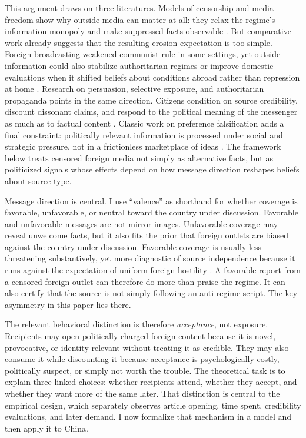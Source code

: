 \documentclass[12pt,american]{article}
\begin{document}
	This argument draws on three literatures. Models of censorship and media freedom show why outside media can matter at all: they relax the regime's information monopoly and make suppressed facts observable \citep{BesleyPrat2006,EgorovGurievSonin2009,gurievtreisman2019,chenyang2019}. But comparative work already suggests that the resulting erosion expectation is too simple. Foreign broadcasting weakened communist rule in some settings, yet outside information could also stabilize authoritarian regimes or improve domestic evaluations when it shifted beliefs about conditions abroad rather than repression at home \citep{KernHainmueller2009,EnikolopovPetrovaZhuravskaya2011,KayserPeress2012,huang2015international}. Research on persuasion, selective exposure, and authoritarian propaganda points in the same direction. Citizens condition on source credibility, discount dissonant claims, and respond to the political meaning of the messenger as much as to factual content \citep{zaller1992,LupiaMcCubbins1998CUP,GentzkowShapiro2006,taberlodge2006,ValloneRossLepper1985,huang2015signal,Huang2018,Horz2021,mattinglyyao2022,panshaoxu2021,GulottyYu2025,Zakharov2026,wangwestwood2024}. Classic work on preference falsification adds a final constraint: politically relevant information is processed under social and strategic pressure, not in a frictionless marketplace of ideas \citep{Kuran1991,Kuran1995}. The framework below treats censored foreign media not simply as alternative facts, but as politicized signals whose effects depend on how message direction reshapes beliefs about source type.
	
	Message direction is central. I use ``valence'' as shorthand for whether coverage is favorable, unfavorable, or neutral toward the country under discussion. Favorable and unfavorable messages are not mirror images. Unfavorable coverage may reveal unwelcome facts, but it also fits the prior that foreign outlets are biased against the country under discussion. Favorable coverage is usually less threatening substantively, yet more diagnostic of source independence because it runs against the expectation of uniform foreign hostility \citep{hovlandweiss1951,GentzkowShapiro2006}. A favorable report from a censored foreign outlet can therefore do more than praise the regime. It can also certify that the source is not simply following an anti-regime script. The key asymmetry in this paper lies there.
	
	The relevant behavioral distinction is therefore \emph{acceptance}, not exposure. Recipients may open politically charged foreign content because it is novel, provocative, or identity-relevant without treating it as credible. They may also consume it while discounting it because acceptance is psychologically costly, politically suspect, or simply not worth the trouble. The theoretical task is to explain three linked choices: whether recipients attend, whether they accept, and whether they want more of the same later. That distinction is central to the empirical design, which separately observes article opening, time spent, credibility evaluations, and later demand. I now formalize that mechanism in a model and then apply it to China.
	
\end{document}
